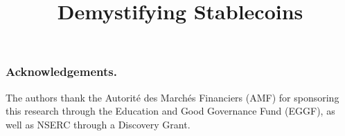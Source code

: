 \documentclass[sigconf]{acmart}
\begin{document}
\title{Demystifying Stablecoins}
%

\begin{abstract}

\end{abstract}


%
%
%

%

\keywords{}


\maketitle



\subsubsection*{Acknowledgements.}
The authors thank the Autorit\'e des March\'es Financiers (AMF) for sponsoring this research through the Education and Good Governance Fund (EGGF), as well as NSERC through a Discovery Grant. 




\end{document}

